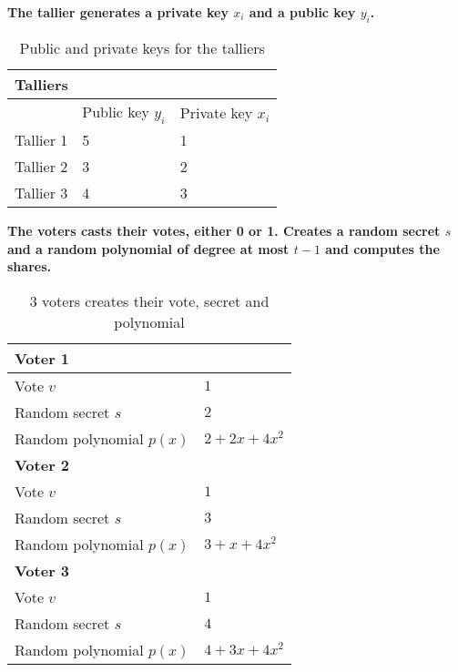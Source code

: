 \noindent
\textbf{The tallier generates a private key $x_i$ and a public key $y_i$.}

\begin{table}[H]
\centering
\begin{tabular}{|l|l|l|}
\hline
\multicolumn{3}{|l|}{\textbf{Talliers}}        \\ \hline
\textbf{} & Public key $y_i$ & Private key $x_i$ \\ \hline
Tallier 1 & 5               & 1                \\ \hline
Tallier 2 & 3               & 2                \\ \hline
Tallier 3 & 4               & 3                \\ \hline
\end{tabular}
\caption{Public and private keys for the talliers}
\label{my-label}
\end{table}

\noindent
\textbf{The voters casts their votes, either 0 or 1. Creates a random secret $s$ and a random polynomial of degree at most $t-1$ and computes the shares.}

\begin{table}[H]
\centering
\begin{tabular}{|l|l|}
\hline
\multicolumn{2}{|l|}{\textbf{Voter 1}}        \\ \hline
Vote $v$          & $1$                         \\ \hline
Random secret $s$ & $2$                         \\ \hline
Random polynomial $p(x)$ & $2+2x+4x^2$ \\ \hline
\multicolumn{2}{|l|}{\textbf{Voter 2}}        \\ \hline
Vote $v$          & $1$                         \\ \hline
Random secret $s$ & $3$                         \\ \hline
Random polynomial $p(x)$ & $3+x+4x^2$ \\ \hline
\multicolumn{2}{|l|}{\textbf{Voter 3}}        \\ \hline
Vote $v$          & $1$                         \\ \hline
Random secret $s$ & $4$                         \\ \hline
Random polynomial $p(x)$ & $4+3x+4x^2$ \\ \hline
\end{tabular}
\caption{3 voters creates their vote, secret and polynomial}
\label{my-label}
\end{table}


